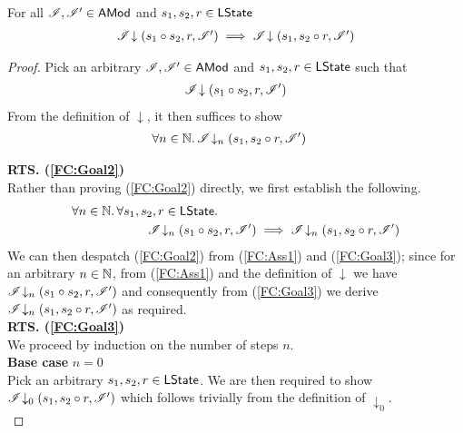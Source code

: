 \begin{lemma}\label{lem:forget-closure}
For all $\mathscr{I}, \mathscr{I}' \in \textsf{AMod}$ and $s_1, s_2, r \in \textsf{LState}$
%
\[
\begin{array}{l}
	\mathscr{I} \!\downarrow \left(s_1 \circ s_2, r, \mathscr{I}'\right) \implies 
	\mathscr{I} \!\downarrow \left(s_1, s_2 \circ r, \mathscr{I}'\right)
\end{array}
\]
%
\begin{proof} Pick an arbitrary $\mathscr{I}, \mathscr{I}' \in \textsf{AMod}$ and $s_1, s_2, r \in \textsf{LState}$ such that 
%
\begin{align}
	\mathscr{I} \!\downarrow \left(s_1 \circ s_2, r, \mathscr{I}'\right) \label{FC:Ass1}
\end{align} 
%
From the definition of $\downarrow$, it then suffices to show
%
\begin{align}
	& \forall n \in \mathbb{N}.\,  \mathscr{I} \!\downarrow_{n} \left(s_1, s_2 \circ r, \mathscr{I}'\right) \label{FC:Goal2}
\end{align}
%

\noindent\textbf{RTS. (\ref{FC:Goal2})} \\
Rather than proving (\ref{FC:Goal2}) directly, we first establish the following.
%
\begin{align}
	\for {n \in \Nats} \for{s_1, s_2, r \in \LStates} & \nonumber\\
	& \hspace{-2cm}\extendsAMUpto{\lmod}{n}{s_1 \composeL s_2}{r}{\lmod'} \implies \extendsAMUpto{\lmod}{n}{s_1}{s_2 \composeL r}{\lmod'} \label{FC:Goal3}
\end{align}
%
We can then despatch (\ref{FC:Goal2}) from (\ref{FC:Ass1}) and (\ref{FC:Goal3}); since for an arbitrary $n \in \mathbb{N}$, from (\ref{FC:Ass1}) and the definition of $\downarrow$ we have $\mathscr{I} \!\downarrow_{n} \left(s_1 \circ s_2, r, \mathscr{I}'\right)$ and consequently from (\ref{FC:Goal3}) we derive $\mathscr{I} \!\downarrow_{n} \left(s_1, s_2 \circ r, \mathscr{I}'\right) $ as required. \\

\noindent\textbf{RTS. (\ref{FC:Goal3})} \\
We proceed by induction on the number of steps $n$.\\

\noindent\textbf{Base case }$n=0$\\
Pick an arbitrary $s_1, s_2, r \in \textsf{LState}$. We are then required to show	$\mathscr{I} \!\downarrow_{0} \left(s_1, s_2 \circ r, \mathscr{I}'\right) $ which follows trivially from the definition of $\downarrow_0$.\\


\end{proof}
\end{lemma}
